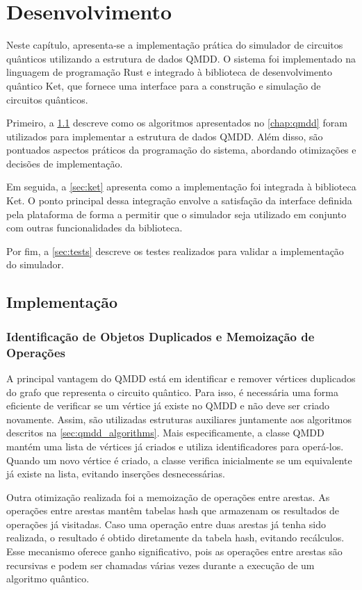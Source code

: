 \chapter{Desenvolvimento}\label{chap:development}

Neste capítulo, apresenta-se a implementação prática do simulador de circuitos quânticos utilizando a estrutura de dados QMDD. O sistema foi implementado na linguagem de programação Rust e integrado à biblioteca de desenvolvimento quântico Ket, que fornece uma interface para a construção e simulação de circuitos quânticos.

Primeiro, a \cref{sec:implementation} descreve como os algoritmos apresentados no \cref{chap:qmdd} foram utilizados para implementar a estrutura de dados QMDD. Além disso, são pontuados aspectos práticos da programação do sistema, abordando otimizações e decisões de implementação.

Em seguida, a \cref{sec:ket} apresenta como a implementação foi integrada à biblioteca Ket. O ponto principal dessa integração envolve a satisfação da interface definida pela plataforma de forma a permitir que o simulador seja utilizado em conjunto com outras funcionalidades da biblioteca.

Por fim, a \cref{sec:tests} descreve os testes realizados para validar a implementação do simulador.

\section{Implementação}\label{sec:implementation}

\subsection{Identificação de Objetos Duplicados e Memoização de Operações}

A principal vantagem do QMDD está em identificar e remover vértices duplicados do grafo que representa o circuito quântico. Para isso, é necessária uma forma eficiente de verificar se um vértice já existe no QMDD e não deve ser criado novamente. Assim, são utilizadas estruturas auxiliares juntamente aos algoritmos descritos na \cref{sec:qmdd_algorithms}. Mais especificamente, a classe QMDD mantém uma lista de vértices já criados e utiliza identificadores para operá-los. Quando um novo vértice é criado, a classe verifica inicialmente se um equivalente já existe na lista, evitando inserções desnecessárias.

Outra otimização realizada foi a memoização de operações entre arestas. As operações entre arestas mantêm tabelas hash que armazenam os resultados de operações já visitadas. Caso uma operação entre duas arestas já tenha sido realizada, o resultado é obtido diretamente da tabela hash, evitando recálculos. Esse mecanismo oferece ganho significativo, pois as operações entre arestas são recursivas e podem ser chamadas várias vezes durante a execução de um algoritmo quântico.

